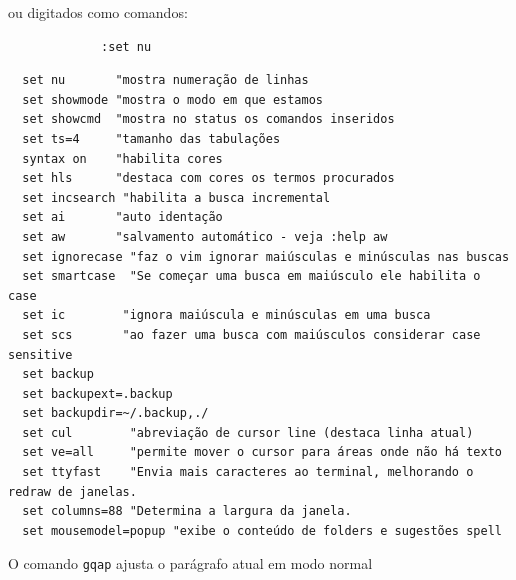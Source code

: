 \documentclass[10pt,a4paper,openany]{book}
\begin{document}
ou digitados como comandos:

\begin{verbatim}
			 :set nu
\end{verbatim}

\begin{verbatim}
  set nu       "mostra numeração de linhas
  set showmode "mostra o modo em que estamos
  set showcmd  "mostra no status os comandos inseridos
  set ts=4     "tamanho das tabulações
  syntax on    "habilita cores
  set hls      "destaca com cores os termos procurados
  set incsearch "habilita a busca incremental
  set ai       "auto identação
  set aw       "salvamento automático - veja :help aw
  set ignorecase "faz o vim ignorar maiúsculas e minúsculas nas buscas
  set smartcase  "Se começar uma busca em maiúsculo ele habilita o case
  set ic        "ignora maiúscula e minúsculas em uma busca
  set scs       "ao fazer uma busca com maiúsculos considerar case sensitive
  set backup
  set backupext=.backup
  set backupdir=~/.backup,./
  set cul        "abreviação de cursor line (destaca linha atual)
  set ve=all     "permite mover o cursor para áreas onde não há texto
  set ttyfast    "Envia mais caracteres ao terminal, melhorando o redraw de janelas.
  set columns=88 "Determina a largura da janela.
  set mousemodel=popup "exibe o conteúdo de folders e sugestões spell
\end{verbatim}

O comando \verb|gqap| ajusta o parágrafo atual em modo normal
\end{document}
